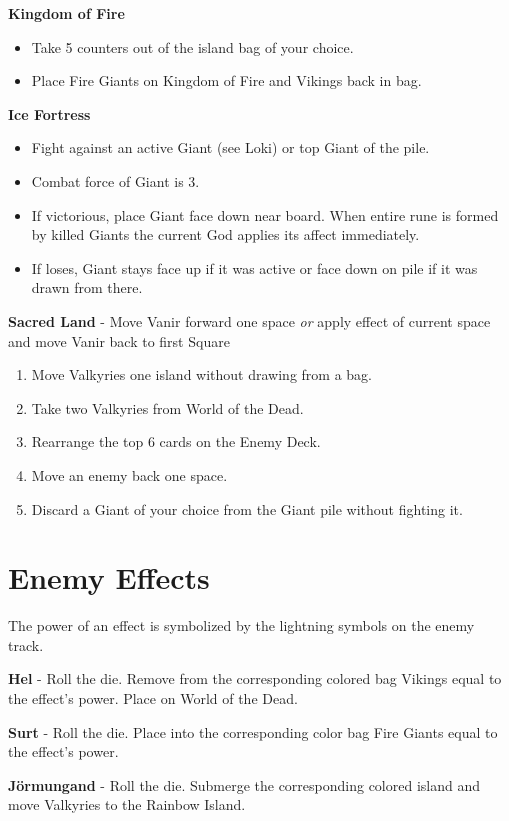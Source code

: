 \documentclass[12pt]{article}
\newenvironment{enumerateCustom}
{\begin{enumerate}
  \setlength{\itemsep}{1pt}
  \setlength{\parskip}{0pt}
  \setlength{\parsep}{0pt}}
{\end{enumerate}}
\newenvironment{itemizeCustom}
{\begin{itemize}
  \setlength{\itemsep}{1pt}
  \setlength{\parskip}{0pt}
  \setlength{\parsep}{0pt}}
{\end{itemize}}
\begin{document}
\begin{multicols*}{2}
\noindent
\textbf{Kingdom of Fire} 
\begin{itemizeCustom}
	\item Take 5 counters out of the island bag of your choice. 
	\item Place Fire Giants on Kingdom of Fire and Vikings back in bag.
\end{itemizeCustom}

\noindent
\textbf{Ice Fortress} 
\begin{itemizeCustom}
	\item Fight against an active Giant (see Loki) or top Giant of the pile.
	\item Combat force of Giant is 3.
	\item If victorious, place Giant face down near board. When entire rune is formed by killed Giants the current God applies its affect immediately.
	\item If loses, Giant stays face up if it was active or face down on pile if it was drawn from there.
\end{itemizeCustom}

\noindent
\textbf{Sacred Land} - Move Vanir forward one space \emph{or} apply effect of current space and move Vanir back to first Square
\begin{enumerateCustom}
	\item Move Valkyries one island without drawing from a bag.
	\item Take two Valkyries from World of the Dead.
	\item Rearrange the top 6 cards on the Enemy Deck.
	\item Move an enemy back one space.
	\item Discard a Giant of your choice from the Giant pile without fighting it.
\end{enumerateCustom}

\section*{Enemy Effects}
The power of an effect is symbolized by the lightning symbols on the enemy track.

\noindent
\textbf{Hel} - Roll the die. Remove from the corresponding colored bag Vikings equal to the effect's power. Place on World of the Dead.

\noindent
\textbf{Surt} - Roll the die. Place into the corresponding color bag Fire Giants equal to the effect's power.

\noindent
\textbf{J\"ormungand} - Roll the die. Submerge the corresponding colored island and move Valkyries to the Rainbow Island.


\end{multicols*}
\end{document}
